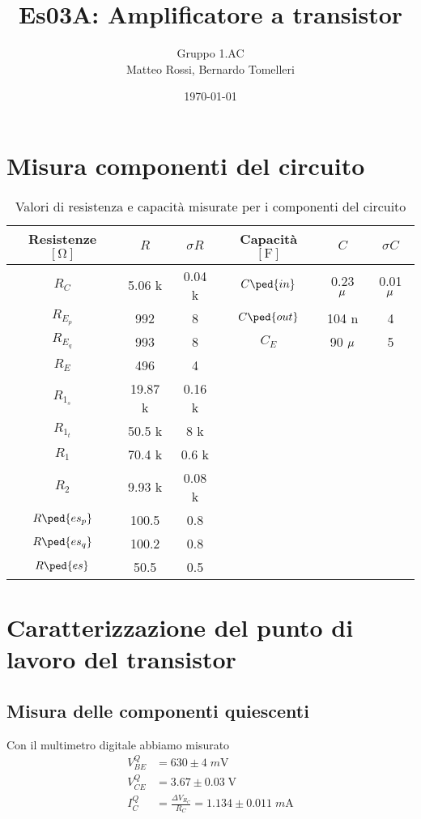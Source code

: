 \documentclass[10pt,a4paper]{article}
\author{Gruppo 1.AC \\ Matteo Rossi, Bernardo Tomelleri}
\title{Es03A: Amplificatore a transistor}
\begin{document}
\date{\today}
\maketitle

\setcounter{section}{0}

\section*{Misura componenti del circuito}
\begin{table}[ht]
\centering
\begin{tabular}{cccccc}
\toprule
Resistenze $[\si{\ohm}]$ & $R$ & $\sigma R$ & Capacità $[\si{\F}]$ & $C$ &
$\sigma C$ \\
\midrule
\midrule
$R_C$		  & 5.06 k	& 0.04 k	 & $C\ped{in}$  & 0.23 $\rm \mu$ & 0.01 $\rm \mu$ \\
$R_{E_p}$	  & 992		& 8      & $C\ped{out}$ & 104 n			 & 4	\\
$R_{E_q}$	  & 993		& 8      & $C_E$        & 90 $\rm \mu$	 & 5	\\
$R_{E}$		  & 496		& 4      &              &				 &		\\
$R_{1_s}$	  & 19.87 k & 0.16 k &              &				 &		\\
$R_{1_t}$	  & 50.5 k  & 8 k	 &              &				 &		\\
$R_1$		  & 70.4 k  & 0.6 k	 &              &				 &		\\
$R_2$		  & 9.93 k  & 0.08 k &              &				 &		\\
$R\ped{es_p}$ & 100.5	& 0.8    &				&				 &		\\
$R\ped{es_q}$ & 100.2	& 0.8    &				&				 &		\\
$R\ped{es}$   & 50.5	& 0.5    &				&				 &		\\
\bottomrule     
\end{tabular}
\caption{Valori di resistenza e capacità misurate per i componenti del
circuito \label{tab: rcmes}}
\end{table}

\section{Caratterizzazione del punto di lavoro del transistor}
\subsection{Misura delle componenti quiescenti}
Con il multimetro digitale abbiamo misurato
\begin{align*}
V_{BE}^Q &= 630 \pm 4 \; \si{m\V} \\
V_{CE}^Q &= 3.67 \pm 0.03 \; \si{\V} \\
I_C^Q &= \frac{\Delta V_{R_C}}{R_C} = 1.134 \pm 0.011 \; \si{m\A} \\
\end{align*}%
\end{document}
